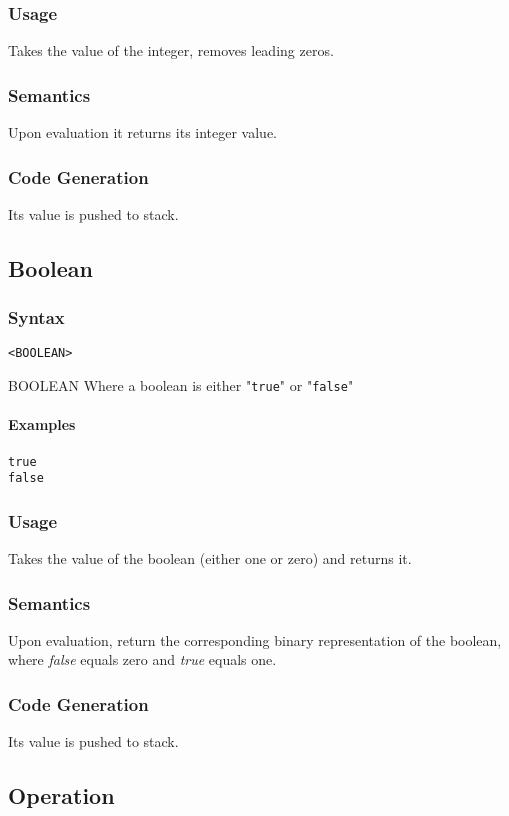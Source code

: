 \documentclass[twoside]{report}
\newenvironment{mycompactdesc}{\begin{adjustwidth}{0.53cm}{}\begin{compactdesc}}{\end{compactdesc}\end{adjustwidth}}
\begin{document}
\subsubsection*{Usage}
Takes the value of the integer, removes leading zeros.
\subsubsection*{Semantics}
Upon evaluation it returns its integer value.
\subsubsection*{Code Generation}
Its value is pushed to stack.


\subsection{Boolean}
\label{def:boolean}
\subsubsection*{Syntax}
\texttt{<BOOLEAN>}
\begin{mycompactdesc}
	\item[BOOLEAN] Where a boolean is either "\texttt{true}" or "\texttt{false}"
\end{mycompactdesc}
\paragraph{Examples}
\begin{verbatim}
true
false
\end{verbatim}
\subsubsection*{Usage}
Takes the value of the boolean (either one or zero) and returns it.
\subsubsection*{Semantics}
Upon evaluation, return the corresponding binary representation of the boolean, where \emph{false} equals zero and \emph{true} equals one.
\subsubsection*{Code Generation}
Its value is pushed to stack.


\subsection{Operation}
\label{def:operation}
\end{document}
